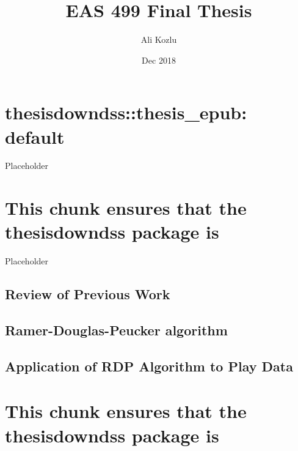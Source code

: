 \documentclass[12pt,oneside]{dukestatscithesis}
\title{EAS 499 Final Thesis}
\author{Ali Kozlu}
\date{Dec 2018}
\theoremstyle{definition}
\theoremstyle{definition}
\theoremstyle{definition}
\theoremstyle{remark}
\begin{document}
  \maketitle

\frontmatter %
\pagestyle{empty} %



  \hypersetup{linkcolor=black}
  \setcounter{tocdepth}{2}
  \tableofcontents

  \listoftables

  \listoffigures



\mainmatter %
\pagestyle{fancyplain} %

\chapter{thesisdowndss::thesis\_epub:
default}\label{thesisdowndssthesis_epub-default}

Placeholder

\chapter{This chunk ensures that the thesisdowndss package
is}\label{this-chunk-ensures-that-the-thesisdowndss-package-is}

Placeholder

\section{Review of Previous Work}\label{review-of-previous-work}

\section{Ramer-Douglas-Peucker
algorithm}\label{ramer-douglas-peucker-algorithm}

\section{Application of RDP Algorithm to Play
Data}\label{application-of-rdp-algorithm-to-play-data}

\chapter{This chunk ensures that the thesisdowndss package
is}\label{this-chunk-ensures-that-the-thesisdowndss-package-is-1}
\end{document}

